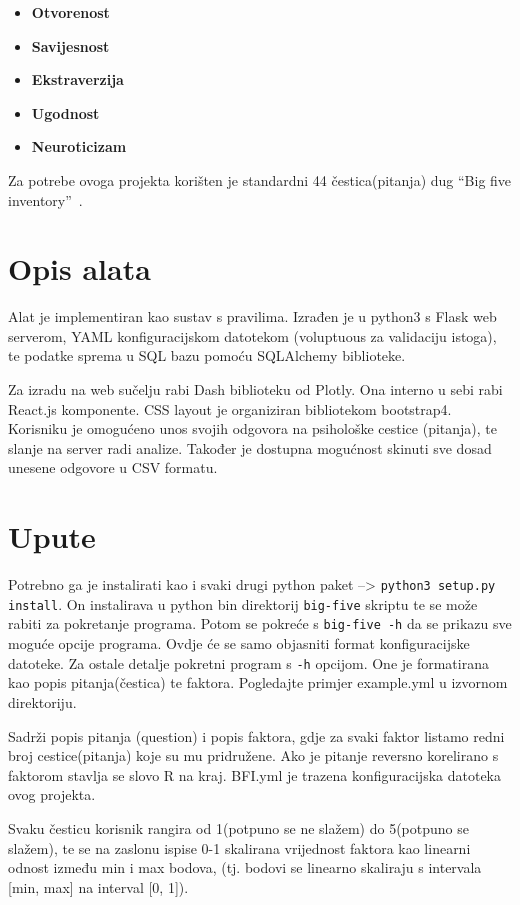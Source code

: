 \documentclass[times, utf8, seminar]{fer}
\begin{document}
\begin{itemize}
    \item \textbf{Otvorenost}
    \item \textbf{Savijesnost}
    \item \textbf{Ekstraverzija}
    \item \textbf{Ugodnost}
    \item \textbf{Neuroticizam}
\end{itemize}

Za potrebe ovoga projekta korišten je standardni 44 čestica(pitanja) dug ``Big five inventory''~\cite{john1999big}.

\chapter{Opis alata}
Alat je implementiran kao sustav s pravilima.
Izrađen je u python3 s Flask web serverom, YAML konfiguracijskom datotekom (voluptuous za validaciju istoga), te podatke sprema u SQL bazu pomoću SQLAlchemy biblioteke.

Za izradu na web sučelju rabi Dash biblioteku od Plotly.
Ona interno u sebi rabi React.js komponente.
CSS layout je organiziran bibliotekom bootstrap4.
Korisniku je omogućeno unos svojih odgovora na psihološke cestice (pitanja), te slanje na server radi analize.
Također je dostupna mogućnost skinuti sve dosad unesene odgovore u CSV formatu.
\chapter{Upute}

Potrebno ga je instalirati kao i svaki drugi python paket --> \texttt{python3 setup.py install}.
On instalirava u python bin direktorij \texttt{big-five} skriptu te se može rabiti za pokretanje programa.
Potom se pokreće s \texttt{big-five -h} da se prikazu sve moguće opcije programa.
Ovdje će se samo objasniti format konfiguracijske datoteke. Za ostale detalje pokretni program s \texttt{-h} opcijom.
One je formatirana kao popis pitanja(čestica) te faktora. Pogledajte primjer example.yml u izvornom direktoriju.

Sadrži popis pitanja (question) i popis faktora, gdje za svaki faktor listamo redni broj cestice(pitanja) koje su mu pridružene. Ako je pitanje reversno korelirano s faktorom stavlja se slovo R na kraj.
BFI.yml je trazena konfiguracijska datoteka ovog projekta.

Svaku česticu korisnik rangira od 1(potpuno se ne slažem) do 5(potpuno se slažem), te se na zaslonu ispise 0-1 skalirana vrijednost faktora kao linearni odnost između min i max bodova, (tj. bodovi se linearno skaliraju s intervala [min, max] na interval [0, 1]).
\end{document}
